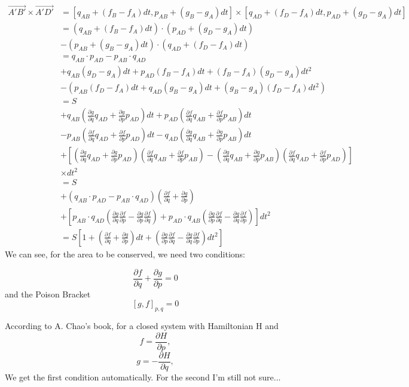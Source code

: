 \documentclass{article}
\begin{document}
	\begin{equation*}
		\begin{split}
			\vec{A'B'}\times\vec{A'D'} &= [q_{AB}+(f_B-f_A)dt,p_{AB}+(g_B-g_A)dt]\times[q_{AD}+(f_D-f_A)dt,p_{AD}+(g_D-g_A)dt]\\
			& = (q_{AB}+(f_B-f_A)dt)\cdot(p_{AD}+(g_D-g_A)dt)\\
			&-(p_{AB}+(g_B-g_A)dt)\cdot(q_{AD}+(f_D-f_A)dt)\\
			& = q_{AB}\cdot p_{AD}-p_{AB}\cdot q_{AD}\\
			& +q_{AB}(g_D-g_A)dt+p_{AD}(f_B-f_A)dt+(f_B-f_A)(g_D-g_A)dt^2\\
			& -(p_{AB}(f_D-f_A)dt+q_{AD}(g_B-g_A)dt+(g_B-g_A)(f_D-f_A)dt^2)\\
			& = S\\
			& +q_{AB}\left(\frac{\partial{g}}{\partial{q}}q_{AD}+\frac{\partial{g}}{\partial{p}}p_{AD}\right)dt
			+p_{AD}\left(\frac{\partial{f}}{\partial{q}}q_{AB}+\frac{\partial{f}}{\partial{p}}p_{AB}\right)dt\\
			&-p_{AB}\left(\frac{\partial{f}}{\partial{q}}q_{AD}+\frac{\partial{f}}{\partial{p}}p_{AD}\right)dt
			-q_{AD}\left(\frac{\partial{g}}{\partial{q}}q_{AB}+\frac{\partial{g}}{\partial{p}}p_{AB}\right)dt\\
			&+\left[\left(\frac{\partial{g}}{\partial{q}}q_{AD}+\frac{\partial{g}}{\partial{p}}p_{AD}\right)\left(\frac{\partial{f}}{\partial{q}}q_{AB}+\frac{\partial{f}}{\partial{p}}p_{AB}\right)-\left(\frac{\partial{g}}{\partial{q}}q_{AB}+\frac{\partial{g}}{\partial{p}}p_{AB}\right)\left(\frac{\partial{f}}{\partial{q}}q_{AD}+\frac{\partial{f}}{\partial{p}}p_{AD}\right)\right]\\
			&\times dt^2\\
			& = S\\
			& + \left(q_{AB}\cdot p_{AD}-p_{AB}\cdot q_{AD}\right) \left(\frac{\partial{f}}{\partial{q}}+\frac{\partial{g}}{\partial{p}}\right)\\
			&+\left[p_{AB}\cdot q_{AD}\left(\frac{\partial{g}}{\partial{q}}\frac{\partial{f}}{\partial{p}}-
			\frac{\partial{g}}{\partial{p}}\frac{\partial{f}}{\partial{q}}\right)
			+p_{AD}\cdot q_{AB}\left(\frac{\partial{g}}{\partial{p}}\frac{\partial{f}}{\partial{q}}-
			\frac{\partial{g}}{\partial{q}}\frac{\partial{f}}{\partial{p}}\right)\right]dt^2\\
			& = S\left[1+\left(\frac{\partial{f}}{\partial{q}}+\frac{\partial{g}}{\partial{p}}\right)dt+
			\left(\frac{\partial{g}}{\partial{p}}\frac{\partial{f}}{\partial{q}}-
			\frac{\partial{g}}{\partial{q}}\frac{\partial{f}}{\partial{p}}\right)dt^2\right]
		\end{split}
	\end{equation*}
	We can see, for the area to be conserved, we need two conditions:\par
	$$ \frac{\partial{f}}{\partial{q}}+\frac{\partial{g}}{\partial{p}}=0$$
	and the Poison Bracket
	$$\left[g,f\right]_{p,q}=0$$
	
	According to A. Chao's book, for a closed system with Hamiltonian H and 
	$$ f = \frac{\partial{H}}{\partial{p}},$$
	$$ g = -\frac{\partial{H}}{\partial{q}},$$
	We get the first condition automatically.
	For the second I'm still not sure...
\end{document}
